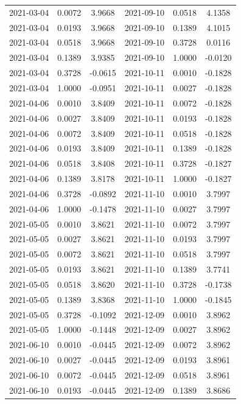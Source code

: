 \begin{footnotesize}
\begin{longtable}{lcc|lcc}
2021-03-04 & 0.0072 & 3.9668 & 2021-09-10 & 0.0518 & 4.1358 \\
2021-03-04 & 0.0193 & 3.9668 & 2021-09-10 & 0.1389 & 4.1015 \\
2021-03-04 & 0.0518 & 3.9668 & 2021-09-10 & 0.3728 & 0.0116 \\
2021-03-04 & 0.1389 & 3.9385 & 2021-09-10 & 1.0000 & -0.0120 \\
2021-03-04 & 0.3728 & -0.0615 & 2021-10-11 & 0.0010 & -0.1828 \\
2021-03-04 & 1.0000 & -0.0951 & 2021-10-11 & 0.0027 & -0.1828 \\
2021-04-06 & 0.0010 & 3.8409 & 2021-10-11 & 0.0072 & -0.1828 \\
2021-04-06 & 0.0027 & 3.8409 & 2021-10-11 & 0.0193 & -0.1828 \\
2021-04-06 & 0.0072 & 3.8409 & 2021-10-11 & 0.0518 & -0.1828 \\
2021-04-06 & 0.0193 & 3.8409 & 2021-10-11 & 0.1389 & -0.1828 \\
2021-04-06 & 0.0518 & 3.8408 & 2021-10-11 & 0.3728 & -0.1827 \\
2021-04-06 & 0.1389 & 3.8178 & 2021-10-11 & 1.0000 & -0.1827 \\
2021-04-06 & 0.3728 & -0.0892 & 2021-11-10 & 0.0010 & 3.7997 \\
2021-04-06 & 1.0000 & -0.1478 & 2021-11-10 & 0.0027 & 3.7997 \\
2021-05-05 & 0.0010 & 3.8621 & 2021-11-10 & 0.0072 & 3.7997 \\
2021-05-05 & 0.0027 & 3.8621 & 2021-11-10 & 0.0193 & 3.7997 \\
2021-05-05 & 0.0072 & 3.8621 & 2021-11-10 & 0.0518 & 3.7997 \\
2021-05-05 & 0.0193 & 3.8621 & 2021-11-10 & 0.1389 & 3.7741 \\
2021-05-05 & 0.0518 & 3.8620 & 2021-11-10 & 0.3728 & -0.1738 \\
2021-05-05 & 0.1389 & 3.8368 & 2021-11-10 & 1.0000 & -0.1845 \\
2021-05-05 & 0.3728 & -0.1092 & 2021-12-09 & 0.0010 & 3.8962 \\
2021-05-05 & 1.0000 & -0.1448 & 2021-12-09 & 0.0027 & 3.8962 \\
2021-06-10 & 0.0010 & -0.0445 & 2021-12-09 & 0.0072 & 3.8962 \\
2021-06-10 & 0.0027 & -0.0445 & 2021-12-09 & 0.0193 & 3.8961 \\
2021-06-10 & 0.0072 & -0.0445 & 2021-12-09 & 0.0518 & 3.8961 \\
2021-06-10 & 0.0193 & -0.0445 & 2021-12-09 & 0.1389 & 3.8686 \\

\end{longtable}
\end{footnotesize}
